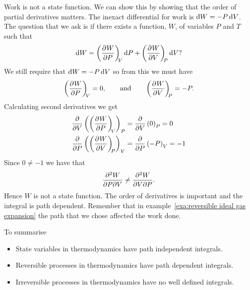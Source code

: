 \documentclass[a4paper]{article}
\newcommand{\ddbar}[1]{\text{\dj}{#1}}
\begin{document}
    Work is not a state function.
    We can show this by showing that the order of partial derivatives matters.
    The inexact differential for work is \(\ddbar{W} = -P\dd{V}\).
    The question that we ask is if there exists a function, \(W\), of variables \(P\) and \(T\) such that
    \[\dd{W} = \left(\pdv[]{W}{P}\right)_{\!\!{V}}\dd{P} + \left(\pdv[]{W}{V}\right)_{\!\!{P}}\dd{V}?\]
    We still require that \(\ddbar{W} = -P\dd{V}\) so from this we must have
    \[\left(\pdv[]{W}{P}\right)_{\!\!{V}} = 0,\qquad\text{and}\qquad \left(\pdv[]{W}{V}\right)_{\!\!{P}} = -P.\]
    Calculating second derivatives we get
    \begin{align*}
        \pdv{V}\left(\left(\pdv[]{W}{P}\right)_{\!\!{V}}\right)_{P} &= \pdv{V}\left(0\right)_{P} = 0\\
        \pdv{P}\left(\left(\pdv[]{W}{V}\right)_{\!\!{P}}\right)_{V} &= \pdv{P}\left(-P\right)_{V} = -1
    \end{align*}
    Since \(0 \ne -1\) we have that
    \[\frac{\partial^2{W}}{\partial{P}\partial{V}} \ne \frac{\partial^2{W}}{\partial{V}\partial{P}}.\]
    Hence \(W\) is not a state function.
    The order of derivatives is important and the integral is path dependent.
    Remember that in example~\ref{exa:reversible ideal gas expansion} the path that we chose affected the work done.
    
    To summarise
    \begin{itemize}
        \item State variables in thermodynamics have path independent integrals.
        \item Reversible processes in thermodynamics have path dependent integrals.
        \item Irreversible processes in thermodynamics have no well defined integrals.
    \end{itemize}
    
\end{document}
